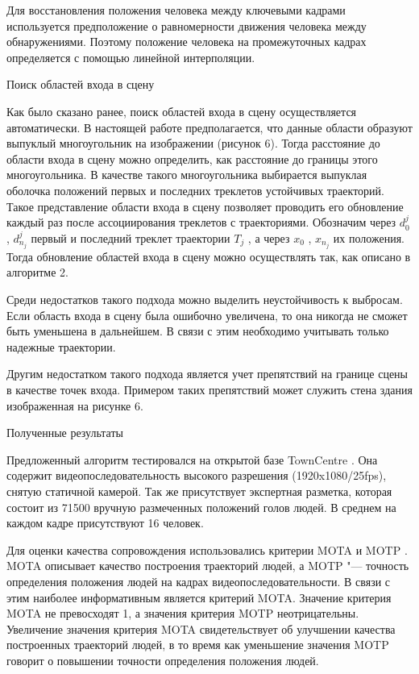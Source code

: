 Для восстановления положения человека между ключевыми кадрами используется предположение о равномерности движения человека между обнаружениями. Поэтому положение человека на промежуточных кадрах определяется с помощью линейной интерполяции.

Поиск областей входа в сцену

Как было сказано ранее, поиск областей входа в сцену осуществляется автоматически. В настоящей работе предполагается, что данные области образуют выпуклый многоугольник на изображении (рисунок 6). Тогда расстояние до области входа в сцену можно определить, как расстояние до границы этого многоугольника. В качестве такого многоугольника выбирается выпуклая оболочка положений первых и последних треклетов устойчивых траекторий. Такое представление области входа в сцену позволяет проводить его обновление каждый раз после ассоциирования треклетов с траекториями. Обозначим через $d_0^j$, $d_{n_j}^j$ первый и последний треклет траектории $T_j$ , а через $x_0$ , $x_{n_j}$ их положения. Тогда обновление областей входа в сцену можно осуществлять так, как описано в
алгоритме 2.

Среди недостатков такого подхода можно выделить неустойчивость к выбросам. Если область входа в сцену была ошибочно увеличена, то она никогда не сможет быть уменьшена в дальнейшем. В связи с этим необходимо учитывать только надежные траектории.

Другим недостатком такого подхода является учет препятствий на границе сцены в качестве точек входа. Примером таких препятствий может служить стена здания изображенная на рисунке 6.

Полученные результаты

Предложенный алгоритм тестировался на открытой базе TownCentre \cite{benfold2011stable}. Она содержит видеопоследовательность высокого разрешения (1920x1080/25fps), снятую статичной камерой. Так же присутствует экспертная разметка, которая состоит из 71500 вручную размеченных положений голов людей. В среднем на каждом кадре присутствуют 16 человек.

Для оценки качества сопровождения использовались критерии MOTA и MOTP \cite{bernardin2008evaluating}. MOTA описывает качество построения траекторий людей, а MOTP "--- точность определения положения людей на кадрах видеопоследовательности. В связи с этим наиболее информативным является критерий MOTA. Значение критерия MOTA не превосходят 1, а значения критерия MOTP неотрицательны. Увеличение значения критерия MOTA свидетельствует об улучшении качества построенных траекторий людей, в то время как уменьшение значения MOTP говорит о повышении точности определения положения людей.

